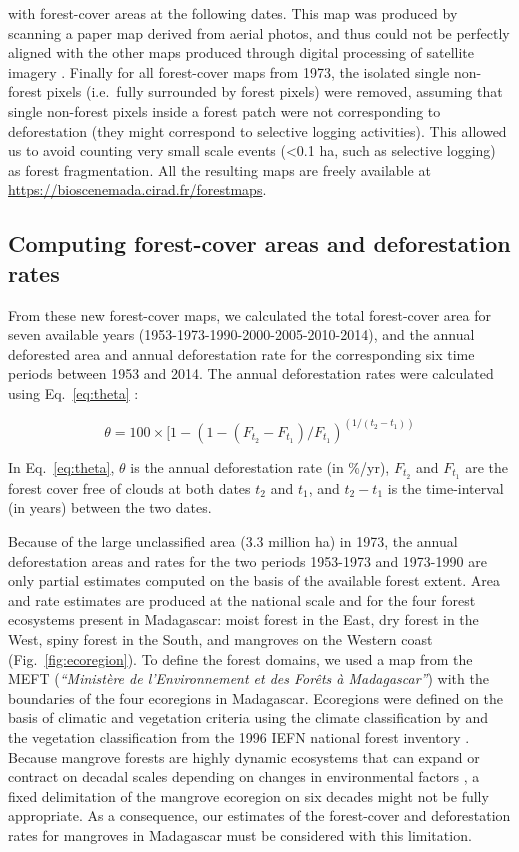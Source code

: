 \documentclass[essd, classical]{copernicus}
\begin{document}
with forest-cover areas at the following dates. This map was produced
by scanning a paper map derived from aerial photos, and thus could not
be perfectly aligned with the other maps produced through digital
processing of satellite imagery \citep{Harper2007}. Finally for all
forest-cover maps from 1973, the isolated single non-forest pixels
(i.e.~fully surrounded by forest pixels) were removed, assuming that
single non-forest pixels inside a forest patch were not corresponding
to deforestation (they might correspond to selective logging
activities). This allowed us to avoid counting very small scale events
(\textless 0.1 ha, such as selective logging) as forest
fragmentation. All the resulting maps are freely available at
\url{https://bioscenemada.cirad.fr/forestmaps}.

\subsection{Computing forest-cover areas and deforestation
rates}

From these new forest-cover maps, we calculated the total forest-cover
area for seven available years (1953-1973-1990-2000-2005-2010-2014),
and the annual deforested area and annual deforestation rate for the
corresponding six time periods between 1953 and 2014. The annual
deforestation rates were calculated using Eq.~\ref{eq:theta}
\citep{Puyravaud2003, Vieilledent2013}:

\begin{equation}
  \label{eq:theta}
  \theta = 100 \times [1-(1-(F_{t_2}-F_{t_1})/F_{t_1})^{(1/(t_2-t_1))}
\end{equation}

In Eq.~\ref{eq:theta}, $\theta$ is the annual deforestation rate (in \%/yr),
$F_{t_2}$ and $F_{t_1}$ are the forest cover free of clouds at both
dates $t_2$ and $t_1$, and $t_2-t_1$ is the time-interval (in
years) between the two dates.

Because of the large unclassified area (3.3 million ha) in 1973, the
annual deforestation areas and rates for the two periods 1953-1973 and
1973-1990 are only partial estimates computed on the basis of the
available forest extent. Area and rate estimates are produced at the
national scale and for the four forest ecosystems present in
Madagascar: moist forest in the East, dry forest in the West, spiny
forest in the South, and mangroves on the Western coast
(Fig.~\ref{fig:ecoregion}). To define the forest domains, we used a
map from the MEFT (\emph{``Ministère de l'Environnement et des Forêts
  à Madagascar''}) with the boundaries of the four ecoregions in
Madagascar. Ecoregions were defined on the basis of climatic and
vegetation criteria using the climate classification by
\citet{Cornet1974} and the vegetation classification from the 1996
IEFN national forest inventory \citep{IEFN1996}. Because mangrove
forests are highly dynamic ecosystems that can expand or contract on
decadal scales depending on changes in environmental factors
\citep{Armitage2015}, a fixed delimitation of the mangrove ecoregion
on six decades might not be fully appropriate. As a consequence, our
estimates of the forest-cover and deforestation rates for mangroves in
Madagascar must be considered with this limitation.
\end{document}
